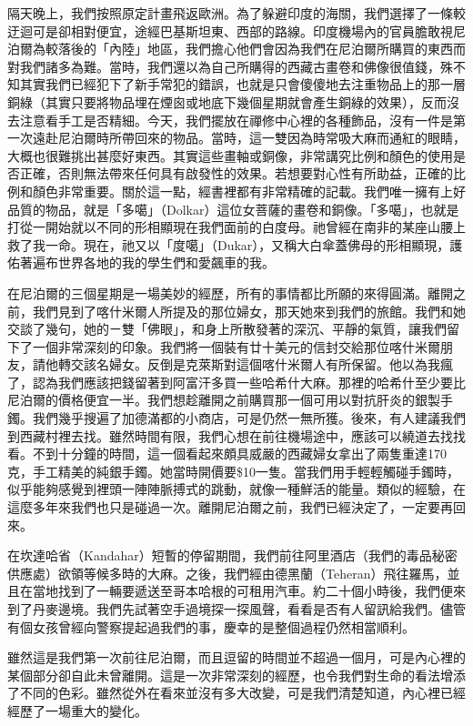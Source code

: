 隔天晚上，我們按照原定計畫飛返歐洲。為了躲避印度的海關，我們選擇了一條較迂迴可是卻相對便宜，途經巴基斯坦東、西部的路線。印度機場內的官員膽敢視尼泊爾為較落後的「內陸」地區，我們擔心他們會因為我們在尼泊爾所購買的東西而對我們諸多為難。當時，我們還以為自己所購得的西藏古畫卷和佛像很值錢，殊不知其實我們已經犯下了新手常犯的錯誤，也就是只會傻傻地去注重物品上的那一層銅綠（其實只要將物品埋在煙囪或地底下幾個星期就會產生銅綠的效果），反而沒去注意看手工是否精細。今天，我們擺放在禪修中心裡的各種飾品，沒有一件是第一次遠赴尼泊爾時所帶回來的物品。當時，這一雙因為時常吸大麻而通紅的眼睛，大概也很難挑出甚麼好東西。其實這些畫軸或銅像，非常講究比例和顏色的使用是否正確，否則無法帶來任何具有啟發性的效果。若想要對心性有所助益，正確的比例和顏色非常重要。關於這一點，經書裡都有非常精確的記載。我們唯一擁有上好品質的物品，就是「多噶」（Dolkar）這位女菩薩的畫卷和銅像。「多噶」，也就是打從一開始就以不同的形相顯現在我們面前的白度母。祂曾經在南非的某座山腰上救了我一命。現在，祂又以「度噶」（Dukar），又稱大白傘蓋佛母的形相顯現，護佑著遍布世界各地的我的學生們和愛飆車的我。

在尼泊爾的三個星期是一場美妙的經歷，所有的事情都比所願的來得圓滿。離開之前，我們見到了喀什米爾人所提及的那位婦女，那天她來到我們的旅館。我們和她交談了幾句，她的ㄧ雙「佛眼」，和身上所散發著的深沉、平靜的氣質，讓我們留下了一個非常深刻的印象。我們將一個裝有廿十美元的信封交給那位喀什米爾朋友，請他轉交該名婦女。反倒是克萊斯對這個喀什米爾人有所保留。他以為我瘋了，認為我們應該把錢留著到阿富汗多買一些哈希什大麻。那裡的哈希什至少要比尼泊爾的價格便宜一半。我們想趁離開之前購買那一個可用以對抗肝炎的銀製手鐲。我們幾乎搜遍了加德滿都的小商店，可是仍然一無所獲。後來，有人建議我們到西藏村裡去找。雖然時間有限，我們心想在前往機場途中，應該可以繞道去找找看。不到十分鐘的時間，這一個看起來頗具威嚴的西藏婦女拿出了兩隻重達170克，手工精美的純銀手鐲。她當時開價要\$10一隻。當我們用手輕輕觸碰手鐲時，似乎能夠感覺到裡頭一陣陣脈搏式的跳動，就像一種鮮活的能量。類似的經驗，在這麼多年來我們也只是碰過一次。離開尼泊爾之前，我們已經決定了，一定要再回來。

在坎達哈省（Kandahar）短暫的停留期間，我們前往阿里酒店（我們的毒品秘密供應處）欲領等候多時的大麻。之後，我們經由德黑蘭（Teheran）飛往羅馬，並且在當地找到了一輛要遞送至哥本哈根的可租用汽車。約二十個小時後，我們便來到了丹麥邊境。我們先試著空手過境探一探風聲，看看是否有人留訊給我們。儘管有個女孩曾經向警察提起過我們的事，慶幸的是整個過程仍然相當順利。

雖然這是我們第一次前往尼泊爾，而且逗留的時間並不超過一個月，可是內心裡的某個部分卻自此未曾離開。這是一次非常深刻的經歷，也令我們對生命的看法增添了不同的色彩。雖然從外在看來並沒有多大改變，可是我們清楚知道，內心裡已經經歷了一場重大的變化。

